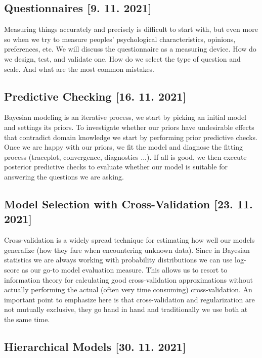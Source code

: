 \documentclass[fleqn,moreauthors,10pt]{ds_report}
\begin{document}
\subsection*{Questionnaires [9. 11. 2021]}

Measuring things accurately and precisely is difficult to start with, but even more so when we try to measure peoples' psychological characteristics, opinions, preferences, etc. We will discuss the questionnaire as a measuring device. How do we design, test, and validate one. How do we select the type of question and scale. And what are the most common mistakes.

\subsection*{Predictive Checking [16. 11. 2021]}

Bayesian modeling is an iterative process, we start by picking an initial model and settings its priors. To investigate whether our priors have undesirable effects that contradict domain knowledge we start by performing prior predictive checks. Once we are happy with our priors, we fit the model and diagnose the fitting process (traceplot, convergence, diagnostics ...). If all is good, we then execute posterior predictive checks to evaluate whether our model is suitable for answering the questions we are asking.

\subsection*{Model Selection with Cross-Validation [23. 11. 2021]}

Cross-validation is a widely spread technique for estimating how well our models generalize (how they fare when encountering unknown data). Since in Bayesian statistics we are always working with probability distributions we can use log-score as our go-to model evaluation measure. This allows us to resort to information theory for calculating good cross-validation approximations without actually performing the actual (often very time consuming) cross-validation. An important point to emphasize here is that cross-validation and regularization are not mutually exclusive, they go hand in hand and traditionally we use both at the same time.

\subsection*{Hierarchical Models [30. 11. 2021]}
\end{document}

